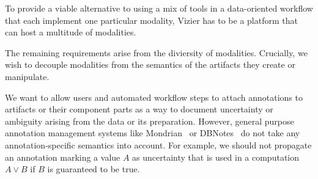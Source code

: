 To provide a viable alternative to using a mix of tools in a data-oriented workflow that each implement one particular modality, Vizier has to be a platform that can host a multitude of modalities.


The remaining requirements arise from the diviersity of modalities.
Crucially, we wish to decouple modalities from the semantics of the artifacts they create or manipulate.



We want to allow users and automated workflow steps to attach annotations to artifacts or their component parts as a way to document uncertainty or ambiguity arising from the data or its preparation.
However, general purpose annotation management systems like Mondrian~\cite{GK05} or DBNotes~\cite{DBLP:conf/sigmod/ChiticariuTV05} do not take any annotation-specific semantics into account. 
For example, we should not propagate an annotation marking a value $A$ as uncertainty that is  used in a computation $A \vee B$ if $B$ is guaranteed to be true.


